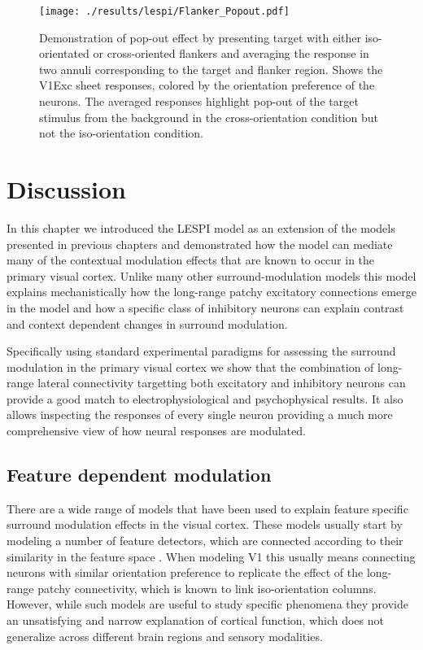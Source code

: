\begin{figure}
	\centering
        \texttt{[image: ./results/lespi/Flanker\_Popout.pdf]}
	\caption[Pop-out effect in simple flanker paradigm.]{Demonstration
      of pop-out effect by presenting target with either
      iso-orientated or cross-oriented flankers and averaging the
      response in two annuli corresponding to the target and flanker
      region. Shows the V1Exc sheet responses, colored by the
      orientation preference of the neurons. The averaged responses
      highlight pop-out of the target stimulus from the background in
      the cross-orientation condition but not the iso-orientation
      condition.}
	\label{Flanker_PopOut}
\end{figure}

\section{Discussion}

In this chapter we introduced the LESPI model as an extension of the
models presented in previous chapters and demonstrated how the model
can mediate many of the contextual modulation effects that are known
to occur in the primary visual cortex. Unlike many other 
surround-modulation models this model explains mechanistically how the
long-range patchy excitatory connections emerge in the model and how a
specific class of inhibitory neurons can explain contrast and context
dependent changes in surround modulation.

Specifically using standard experimental paradigms for assessing the
surround modulation in the primary visual cortex we show that the
combination of long-range lateral connectivity targetting both
excitatory and inhibitory neurons can provide a good match to
electrophysiological and psychophysical results. It also allows
inspecting the responses of every single neuron providing a much more
comprehensive view of how neural responses are modulated.

\subsection{Feature dependent modulation}

There are a wide range of models that have been used to explain
feature specific surround modulation effects in the visual
cortex. These models usually start by modeling a number of feature
detectors, which are connected according to their similarity in the
feature space \citep{Li2002, Schwabe2006}. When modeling V1 this
usually means connecting neurons with similar orientation preference
to replicate the effect of the long-range patchy connectivity, which
is known to link iso-orientation columns. However, while such models
are useful to study specific phenomena they provide an unsatisfying
and narrow explanation of cortical function, which does not generalize
across different brain regions and sensory modalities.


